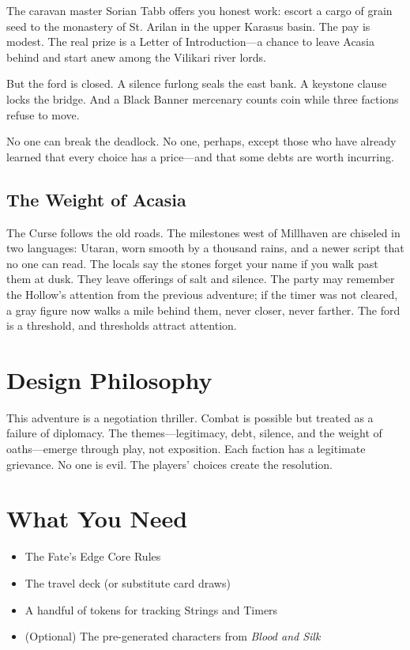 \documentclass[10pt,twoside]{book}
\begin{document}
The caravan master Sorian Tabb offers you honest work: escort a cargo of grain seed to the monastery of St. Arilan in the upper Karasus basin. The pay is modest. The real prize is a Letter of Introduction---a chance to leave Acasia behind and start anew among the Vilikari river lords.

But the ford is closed. A silence furlong seals the east bank. A keystone clause locks the bridge. And a Black Banner mercenary counts coin while three factions refuse to move.

No one can break the deadlock. No one, perhaps, except those who have already learned that every choice has a price---and that some debts are worth incurring.

\subsection*{The Weight of Acasia}

The Curse follows the old roads. The milestones west of Millhaven are chiseled in two languages: Utaran, worn smooth by a thousand rains, and a newer script that no one can read. The locals say the stones forget your name if you walk past them at dusk. They leave offerings of salt and silence. The party may remember the Hollow's attention from the previous adventure; if the timer was not cleared, a gray figure now walks a mile behind them, never closer, never farther. The ford is a threshold, and thresholds attract attention.

\section*{Design Philosophy}

This adventure is a negotiation thriller. Combat is possible but treated as a failure of diplomacy. The themes---legitimacy, debt, silence, and the weight of oaths---emerge through play, not exposition. Each faction has a legitimate grievance. No one is evil. The players' choices create the resolution.

\section*{What You Need}

\begin{itemize}
\item The Fate's Edge Core Rules
\item The travel deck (or substitute card draws)
\item A handful of tokens for tracking Strings and Timers
\item (Optional) The pre-generated characters from \textit{Blood and Silk}
\end{itemize}
\end{document}
